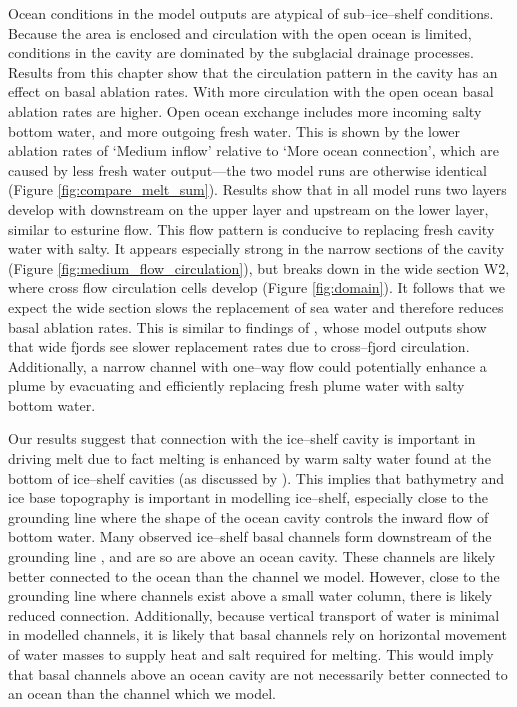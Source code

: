 Ocean conditions in the model outputs are atypical of sub--ice--shelf conditions. Because the area is enclosed and circulation with the open ocean is limited, conditions in the cavity are dominated by the subglacial drainage processes.
Results from this chapter show that the circulation pattern in the cavity has an effect on basal ablation rates. With more circulation with the open ocean basal ablation rates are higher. Open ocean exchange includes more incoming salty bottom water, and more outgoing fresh water. This is shown by the lower ablation rates of `Medium inflow' relative to `More ocean connection', which are caused by less fresh water output---the two model runs are otherwise identical (Figure \ref{fig:compare_melt_sum}).  Results show that in all model runs two layers develop with downstream on the upper layer and upstream on the lower layer,  similar to esturine flow. This flow pattern is conducive to replacing fresh cavity water with salty. It appears especially strong in the narrow sections of the cavity (Figure \ref{fig:medium_flow_circulation}), but breaks down in the wide section W2, where cross flow circulation cells develop (Figure \ref{fig:domain}). It follows that we expect the wide section slows the replacement of sea water and therefore reduces basal ablation rates. This is similar to findings of \cite{carroll2017subglacial}, whose model outputs show that wide fjords see slower replacement rates due to cross--fjord circulation. Additionally, a narrow channel with one--way flow could potentially enhance a plume by evacuating and efficiently replacing fresh plume water with salty bottom water.

Our results suggest that connection with the ice--shelf cavity is important in driving melt due to fact melting is enhanced by warm salty water found at the bottom of ice--shelf cavities  (as discussed by \cite{goldberg2019accurately}). This implies that bathymetry and ice base topography is important in modelling ice--shelf, especially close to the grounding line where the shape of the ocean cavity controls the inward flow of bottom water. 
Many observed ice--shelf basal channels form downstream of the grounding line \citep{alley2016impacts}, and are so are above an ocean cavity. These channels are likely better connected to the ocean than the channel we model. However, close to the grounding line where channels exist above a small water column, there is likely reduced connection. Additionally, because vertical transport of water is minimal in modelled channels, it is likely that basal channels rely on horizontal movement of water masses to supply heat and salt required for melting. This would imply that basal channels above an ocean cavity are not necessarily better connected to an ocean than the channel which we model. 

